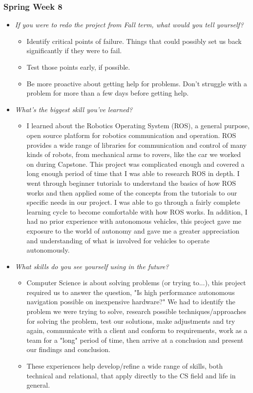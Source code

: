 \documentclass{article}
\begin{document}
\subsubsection{Spring Week 8}
\begin{itemize}
    \item \textit{If you were to redo the project from Fall term, what would you tell yourself?}
    \begin{itemize}
        \item Identify critical points of failure. Things that could possibly set us back significantly if they were to fail.
        \item Test those points early, if possible.
        \item Be more proactive about getting help for problems. Don't struggle with a problem for more than a few days before getting help.
    \end{itemize}

    \item \textit{What's the biggest skill you've learned?}
    \begin{itemize}
        \item I learned about the Robotics Operating System (ROS), a general purpose, open source platform for robotics communication and operation. ROS provides a wide range of libraries for communication and control of many kinds of robots, from mechanical arms to rovers, like the car we worked on during Capstone. This project was complicated enough and covered a long enough period of time that I was able to research ROS in depth. I went through beginner tutorials to understand the basics of how ROS works and then applied some of the concepts from the tutorials to our specific needs in our project. I was able to go through a fairly complete learning cycle to become comfortable with how ROS works. In addition, I had no prior experience with autonomous vehicles, this project gave me exposure to the world of autonomy and gave me a greater appreciation and understanding of what is involved for vehicles to operate autonomously.
    \end{itemize}

    \item \textit{What skills do you see yourself using in the future?}
    \begin{itemize}
        \item Computer Science is about solving problems (or trying to...), this project required us to answer the question, "Is high performance autonomous navigation possible on inexpensive hardware?" We had to identify the problem we were trying to solve, research possible techniques/approaches for solving the problem, test our solutions, make adjustments and try again, communicate with a client and conform to requirements, work as a team for a "long" period of time, then arrive at a conclusion and present our findings and conclusion.
        \item These experiences help develop/refine a wide range of skills, both technical and relational, that apply directly to the CS field and life in general.
    \end{itemize}


\end{itemize}
\end{document}
